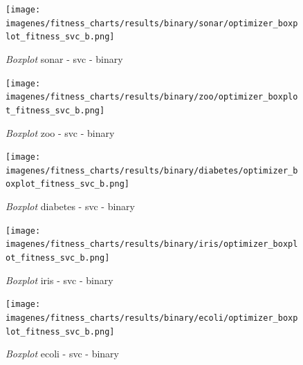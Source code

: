 \begin{figure}[htp]
    \centering
    \texttt{[image: imagenes/fitness\_charts/results/binary/sonar/optimizer\_boxplot\_fitness\_svc\_b.png]}
    \caption{\textit{Boxplot} sonar - svc - binary}

\end{figure}

\begin{figure}[htp]
    \centering
    \texttt{[image: imagenes/fitness\_charts/results/binary/zoo/optimizer\_boxplot\_fitness\_svc\_b.png]}
    \caption{\textit{Boxplot} zoo - svc - binary}

\end{figure}

\begin{figure}[htp]
    \centering
    \texttt{[image: imagenes/fitness\_charts/results/binary/diabetes/optimizer\_boxplot\_fitness\_svc\_b.png]}
    \caption{\textit{Boxplot} diabetes - svc - binary}

\end{figure}

\begin{figure}[htp]
    \centering
    \texttt{[image: imagenes/fitness\_charts/results/binary/iris/optimizer\_boxplot\_fitness\_svc\_b.png]}
    \caption{\textit{Boxplot} iris - svc - binary}

\end{figure}

\begin{figure}[htp]
    \centering
    \texttt{[image: imagenes/fitness\_charts/results/binary/ecoli/optimizer\_boxplot\_fitness\_svc\_b.png]}
    \caption{\textit{Boxplot} ecoli - svc - binary}

\end{figure}

